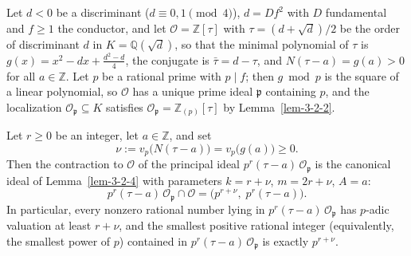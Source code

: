 
\begin{lemma}
  \label{lem-3-2-7}
  Let $d < 0$ be a discriminant ($d \equiv 0, 1 \pmod 4$), $d = D f^2$ with
  $D$ fundamental and $f \geq 1$ the conductor, and let
  $\mathcal{O} = \mathbb{Z}[\tau]$ with $\tau = (d + \sqrt{d})/2$ be the order
  of discriminant $d$ in $K = \mathbb{Q}(\sqrt{d})$, so that the minimal
  polynomial of $\tau$ is $g(x) = x^2 - dx + \frac{d^2 - d}{4}$, the
  conjugate is $\bar{\tau} = d - \tau$, and $N(\tau - a) = g(a) > 0$ for all
  $a \in \mathbb{Z}$. Let $p$ be a rational prime with $p \mid f$; then
  $g \bmod p$ is the square of a linear polynomial, so $\mathcal{O}$ has a
  unique prime ideal $\mathfrak{p}$ containing $p$, and the localization
  $\mathcal{O}_{\mathfrak{p}} \subseteq K$ satisfies
  $\mathcal{O}_{\mathfrak{p}} = \mathbb{Z}_{(p)}[\tau]$ by
  Lemma~\ref{lem-3-2-2}.

  Let $r \geq 0$ be an integer, let $a \in \mathbb{Z}$, and set
  \[
    \nu := v_p\bigl(N(\tau - a)\bigr) = v_p\bigl(g(a)\bigr) \geq 0 .
  \]
  Then the contraction to $\mathcal{O}$ of the principal ideal
  $p^r(\tau - a)\,\mathcal{O}_{\mathfrak{p}}$ is the canonical ideal of
  Lemma~\ref{lem-3-2-4} with parameters $k = r + \nu$, $m = 2r + \nu$,
  $A = a$:
  \[
    p^r(\tau - a)\,\mathcal{O}_{\mathfrak{p}} \cap \mathcal{O}
      = \bigl(p^{r+\nu},\; p^r(\tau - a)\bigr) .
  \]
  In particular, every nonzero rational number lying in
  $p^r(\tau - a)\,\mathcal{O}_{\mathfrak{p}}$ has $p$-adic valuation at least
  $r + \nu$, and the smallest positive rational integer (equivalently, the
  smallest power of $p$) contained in
  $p^r(\tau - a)\,\mathcal{O}_{\mathfrak{p}}$ is exactly $p^{r+\nu}$.
\end{lemma}

